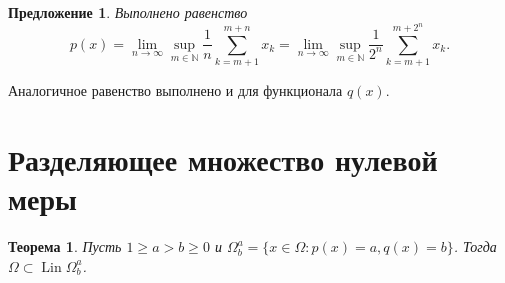 \documentclass{article}
\theoremstyle{plain}
\newtheorem{theorem}{Теорема}
\newtheorem{proposition}{Предложение}
\theoremstyle{definition}
\begin{document}
\begin{fulltext}
%
\begin{proposition}
	\label{prop:Sucheston_partial_limit}
	Выполнено равенство
	\begin{equation*}
		p(x) = \lim_{n\to\infty} \sup_{m\in\mathbb{N}}  \frac{1}{n} \sum_{k=m+1}^{m+n} x_k
		= \lim_{n\to\infty} \sup_{m\in\mathbb{N}}  \frac{1}{2^n} \sum_{k=m+1}^{m+2^n} x_k
		.
	\end{equation*}
\end{proposition}
Аналогичное равенство выполнено и для функционала $q(x)$.

\section{Разделяющее множество нулевой меры}

\begin{theorem}
	\label{thm:Lin_Omega_Sucheston}
	Пусть
	$1 \geq a > b \geq 0$ и
	$\Omega^a_b = \{x\in\Omega : p(x) = a, q(x) = b\}$.
	Тогда $\Omega \subset \operatorname{Lin} \Omega^a_b$.
\end{theorem}


\end{fulltext}
\end{document}
